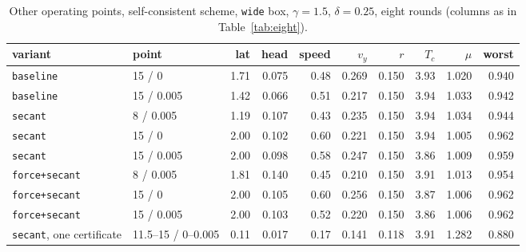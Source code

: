 \documentclass[11pt]{article}
\begin{document}
\begin{table}
\centering\small
\caption{Other operating points, self-consistent scheme, \texttt{wide} box,
$\gamma=1.5$, $\delta=0.25$, eight rounds (columns as in Table~\ref{tab:eight}).}
\label{tab:points}
\begin{tabular}{llrrrrrrrr}
\toprule
variant & point & lat & head & speed & $v_y$ & $r$ & $T_c$ & $\mu$ & worst \\
\midrule
\texttt{baseline} & 15 / 0 & 1.71 & 0.075 & 0.48 & 0.269 & 0.150 & 3.93 & 1.020 & 0.940 \\
\texttt{baseline} & 15 / 0.005 & 1.42 & 0.066 & 0.51 & 0.217 & 0.150 & 3.94 & 1.033 & 0.942 \\
\texttt{secant} & 8 / 0.005 & 1.19 & 0.107 & 0.43 & 0.235 & 0.150 & 3.94 & 1.034 & 0.944 \\
\texttt{secant} & 15 / 0 & 2.00 & 0.102 & 0.60 & 0.221 & 0.150 & 3.94 & 1.005 & 0.962 \\
\texttt{secant} & 15 / 0.005 & 2.00 & 0.098 & 0.58 & 0.247 & 0.150 & 3.86 & 1.009 & 0.959 \\
\texttt{force{+}secant} & 8 / 0.005 & 1.81 & 0.140 & 0.45 & 0.210 & 0.150 & 3.91 & 1.013 & 0.954 \\
\texttt{force{+}secant} & 15 / 0 & 2.00 & 0.105 & 0.60 & 0.256 & 0.150 & 3.87 & 1.006 & 0.962 \\
\texttt{force{+}secant} & 15 / 0.005 & 2.00 & 0.103 & 0.52 & 0.220 & 0.150 & 3.86 & 1.006 & 0.962 \\
\texttt{secant}, one certificate & 11.5--15 / 0--0.005 & 0.11 & 0.017 & 0.17 & 0.141 & 0.118 & 3.91 & 1.282 & 0.880 \\
\bottomrule
\end{tabular}
\end{table}
\end{document}

